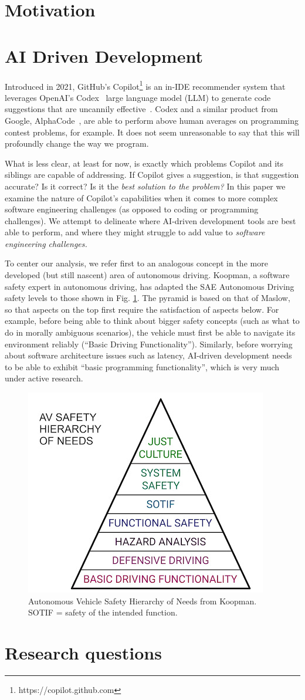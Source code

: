 \section{Motivation}
\section{AI Driven Development}
Introduced in 2021, GitHub's Copilot\footnote{https://copilot.github.com} is an in-IDE recommender system that leverages OpenAI's Codex~\cite{copilot} large language model (LLM) to generate code suggestions that are uncannily effective~\cite{copilot}. Codex and a similar product from Google, AlphaCode~\cite{alphacode}, are able to perform above human averages on programming contest problems, for example. It does not seem unreasonable to say that this will profoundly change the way we program.

What is less clear, at least for now, is exactly which problems Copilot and its siblings are capable of addressing. If Copilot gives a suggestion, is that suggestion accurate? Is it correct? Is it the \emph{best solution to the problem?} 
In this paper we examine the nature of Copilot's capabilities when it comes to more complex software engineering challenges (as opposed to coding or programming challenges). We attempt to delineate where AI-driven development tools are best able to perform, and where they might struggle to add value to \emph{software engineering challenges.}

To center our analysis, we refer first to an analogous concept in the more developed (but still nascent) area of autonomous driving. 
Koopman, a software safety expert in autonomous driving, has adapted the SAE Autonomous Driving safety levels \cite{sae} to those shown in Fig. \ref{fig:koopman_pyramid}. 
The pyramid is based on that of Maslow, so that aspects on the top first require the satisfaction of aspects below. 
For example, before being able to think about bigger safety concepts (such as what to do in morally ambiguous scenarios), the vehicle must first be able to navigate its environment reliably (``Basic Driving Functionality'').
Similarly, before worrying about software architecture issues such as latency, AI-driven development needs to be able to exhibit ``basic programming functionality'', which is very much under active research.

\begin{figure}
    \centering
    \includegraphics[width=.5\linewidth]{Figures/koopman_pyramid.jpeg}
    \caption{Autonomous Vehicle Safety Hierarchy of Needs from Koopman\cite{koopman}. SOTIF = safety of the intended function.}
    \label{fig:koopman_pyramid}
\end{figure}

\section{Research questions}

